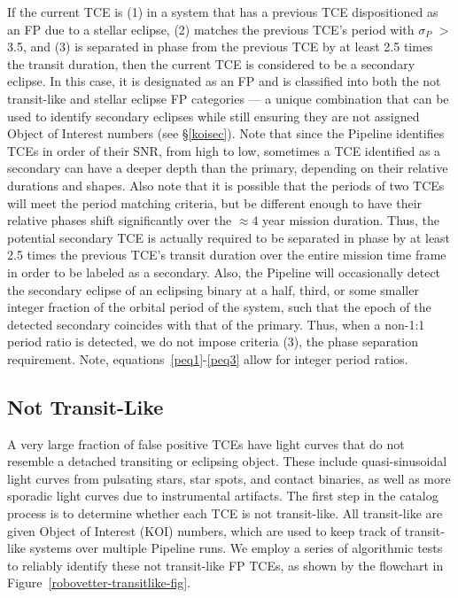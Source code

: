 If the current TCE is (1) in a system that has a previous TCE dispositioned as an FP due to a stellar eclipse, (2) matches the previous TCE's period with $\sigma_{P}$ $>$ 3.5, and (3) is separated in phase from the previous TCE by at least 2.5 times the transit duration, then the current TCE is considered to be a secondary eclipse. In this case, it is designated as an FP and is classified into both the not transit-like and stellar eclipse FP categories --- a unique combination that can be used to identify secondary eclipses while still ensuring they are not assigned \kepler{} Object of Interest numbers (see \S\ref{koisec}). Note that since the \kepler{} Pipeline identifies TCEs in order of their SNR, from high to low, sometimes a TCE identified as a secondary can have a deeper depth than the primary, depending on their relative durations and shapes. Also note that it is possible that the periods of two TCEs will meet the period matching criteria, but be different enough to have their relative phases shift significantly over the $\approx$4 year mission duration. Thus, the potential secondary TCE is actually required to be separated in phase by at least 2.5 times the previous TCE's transit duration over the entire mission time frame in order to be labeled as a secondary. Also, the \kepler{} Pipeline will occasionally detect the secondary eclipse of an eclipsing binary at a half, third, or some smaller integer fraction of the orbital period of the system, such that the epoch of the detected secondary coincides with that of the primary. Thus, when a non-1:1 period ratio is detected, we do not impose criteria (3), the phase separation requirement. Note, equations~\ref{peq1}-\ref{peq3} allow for integer period ratios.



\subsection{Not Transit-Like}
\label{nottransitlikesec}

A very large fraction of false positive TCEs have light curves that do not resemble a detached transiting or eclipsing object. These include quasi-sinusoidal light curves from pulsating stars, star spots, and contact binaries, as well as more sporadic light curves due to instrumental artifacts. The first step in the catalog process is to determine whether each TCE is not transit-like. All transit-like  are given \kepler{} Object of Interest (KOI) numbers, which are used to keep track of transit-like systems over multiple \kepler{} Pipeline runs. We employ a series of algorithmic tests to reliably identify these not transit-like FP TCEs, as shown by the flowchart in Figure~\ref{robovetter-transitlike-fig}.


